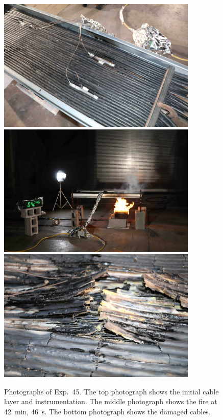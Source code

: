 \begin{figure}[p]
\centering
\includegraphics[height=2.50in]{../FIGURES/Test_45_setup} \\ \vspace{0.1in}
\includegraphics[height=2.50in]{../FIGURES/Test_45_42_min_46_s} \\ \vspace{0.1in}
\includegraphics[height=2.50in]{../FIGURES/Test_45_damage}
\caption[Photographs of Exp.~45]{Photographs of Exp.~45. The top photograph shows the initial cable layer and instrumentation. The middle photograph shows the fire at 42~min, 46~s. The bottom photograph shows the damaged cables.}
\label{fig:Test_45_photos}
\end{figure}


